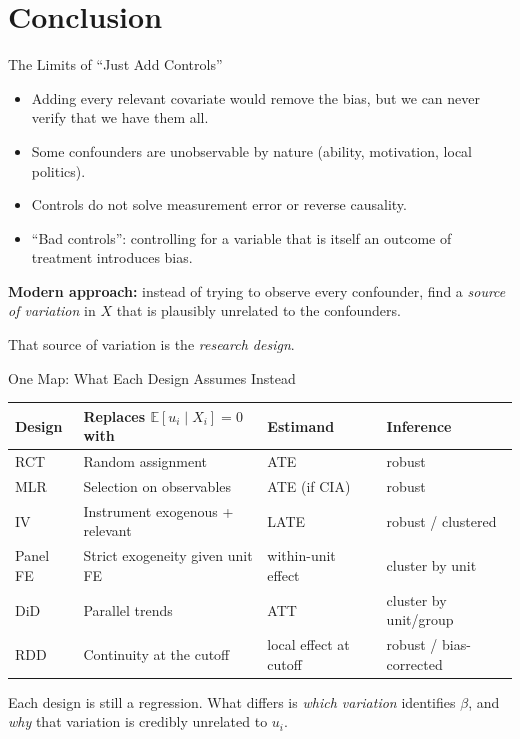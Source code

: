\documentclass[9pt,aspectratio=169]{beamer}
\newcommand{\E}{\mathbb{E}}
\begin{document}
\section{Conclusion}

\begin{frame}{The Limits of ``Just Add Controls''}
\linespread{1.2}\selectfont
  \begin{itemize}
    \item Adding every relevant covariate would remove the bias, but we can never verify that we have them all.
    \item Some confounders are unobservable by nature (ability, motivation, local politics).
    \item Controls do not solve measurement error or reverse causality.
    \item ``Bad controls'': controlling for a variable that is itself an outcome of treatment introduces bias.
  \end{itemize}
  \medskip
  \textbf{Modern approach:} instead of trying to observe every confounder, find a \emph{source of variation} in $X$ that is plausibly unrelated to the confounders.
  \medskip

  That source of variation is the \emph{research design}.
\end{frame}


\begin{frame}{One Map: What Each Design Assumes Instead}
\linespread{1.2}\selectfont
  \begin{tabular}{@{}llll@{}}
    \toprule
    Design & Replaces $\E[u_i\mid X_i]=0$ with & Estimand & Inference \\
    \midrule
    RCT & Random assignment & ATE & robust \\
    MLR & Selection on observables & ATE (if CIA) & robust \\
    IV & Instrument exogenous + relevant & LATE & robust / clustered \\
    Panel FE & Strict exogeneity given unit FE & within-unit effect & cluster by unit \\
    DiD & Parallel trends & ATT & cluster by unit/group \\
    RDD & Continuity at the cutoff & local effect at cutoff & robust / bias-corrected \\
    \bottomrule
  \end{tabular}
  \medskip

  \normalsize
  Each design is still a regression. What differs is \emph{which variation} identifies $\beta$, and \emph{why} that variation is credibly unrelated to $u_i$.
\end{frame}
\end{document}
